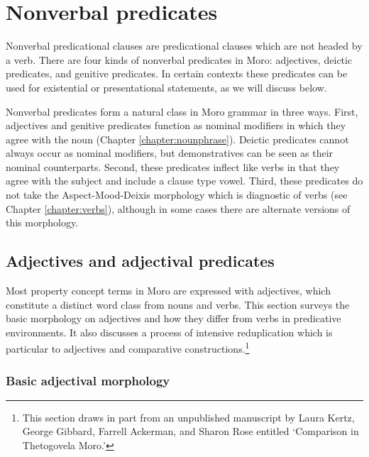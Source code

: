 \chapter{Nonverbal predicates}\label{chapter:nonverbal}

Nonverbal predicational clauses are predicational clauses which are not headed by a verb. There are four kinds of nonverbal predicates in Moro: adjectives, deictic predicates, and genitive predicates. In certain contexts these predicates can be used for existential or presentational statements, as we will discuss below. 

Nonverbal predicates form a natural class in Moro grammar in three ways. First, adjectives and genitive predicates function as nominal modifiers in which they agree with the noun (Chapter \ref{chapter:nounphrase}). Deictic predicates cannot always occur as nominal modifiers, but demonstratives can be seen as their nominal counterparts. Second, these predicates inflect like verbs in that they agree with the subject and include a clause type vowel. Third, these predicates do not take the Aspect-Mood-Deixis morphology which is diagnostic of verbs (see Chapter \ref{chapter:verbs}), although in some cases there are alternate versions of this morphology.


\section{Adjectives and adjectival predicates}\label{section:adjective}

Most property concept terms in Moro are expressed with adjectives, which constitute a distinct word class from nouns and verbs. This section surveys the basic morphology on adjectives and how they differ from verbs in predicative environments. It also discusses a process of intensive reduplication which is particular to adjectives and comparative constructions.\footnote{This section draws in part from an unpublished manuscript by Laura Kertz, George Gibbard, Farrell Ackerman, and Sharon Rose entitled `Comparison in Thetogovela Moro.'}

\subsection{Basic adjectival morphology}\label{sec:ch10:admorph}

